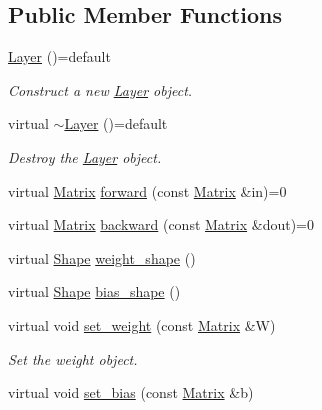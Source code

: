 \subsection*{Public Member Functions}
\begin{DoxyCompactItemize}
\item 
\mbox{\hyperlink{class_layer_a7db1fc76bec3431efbb0984192e2ae23}{Layer}} ()=default
\begin{DoxyCompactList}\small\item\em Construct a new \mbox{\hyperlink{class_layer}{Layer}} object. \end{DoxyCompactList}\item 
virtual \mbox{\hyperlink{class_layer_ac2c7d2238eb3d09a2198736c5b10f940}{$\sim$\+Layer}} ()=default
\begin{DoxyCompactList}\small\item\em Destroy the \mbox{\hyperlink{class_layer}{Layer}} object. \end{DoxyCompactList}\item 
virtual \mbox{\hyperlink{class_layer_a22b1e7286096aa62bd245536c8ebdaf1}{Matrix}} \mbox{\hyperlink{class_layer_ab15b665c86974b1cf1d7ba4e309cb0e5}{forward}} (const \mbox{\hyperlink{class_layer_a22b1e7286096aa62bd245536c8ebdaf1}{Matrix}} \&in)=0
\item 
virtual \mbox{\hyperlink{class_layer_a22b1e7286096aa62bd245536c8ebdaf1}{Matrix}} \mbox{\hyperlink{class_layer_ac4c13a3a85bfdd4d7d4d18669e3299fe}{backward}} (const \mbox{\hyperlink{class_layer_a22b1e7286096aa62bd245536c8ebdaf1}{Matrix}} \&dout)=0
\item 
virtual \mbox{\hyperlink{class_layer_a8313f42d2292d12dd5d40cc115636693}{Shape}} \mbox{\hyperlink{class_layer_afa0ec609fc7ef0053a362ea54d0f6f78}{weight\+\_\+shape}} ()
\item 
virtual \mbox{\hyperlink{class_layer_a8313f42d2292d12dd5d40cc115636693}{Shape}} \mbox{\hyperlink{class_layer_ad557254136784e9312ebb197b2bd3faf}{bias\+\_\+shape}} ()
\item 
virtual void \mbox{\hyperlink{class_layer_a8fd54bf1a860868b13f4365a264c693c}{set\+\_\+weight}} (const \mbox{\hyperlink{class_layer_a22b1e7286096aa62bd245536c8ebdaf1}{Matrix}} \&W)
\begin{DoxyCompactList}\small\item\em Set the weight object. \end{DoxyCompactList}\item 
virtual void \mbox{\hyperlink{class_layer_a16eecfdfbd98cb94918b7d19ecaeb740}{set\+\_\+bias}} (const \mbox{\hyperlink{class_layer_a22b1e7286096aa62bd245536c8ebdaf1}{Matrix}} \&b)

\end{DoxyCompactItemize}
